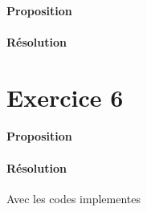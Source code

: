 \documentclass{article}
\begin{document}
\paragraph{Proposition}

\paragraph{Résolution}



\section{Exercice 6}
\paragraph{Proposition}

\paragraph{Résolution}Avec les codes implementes
\end{document}
